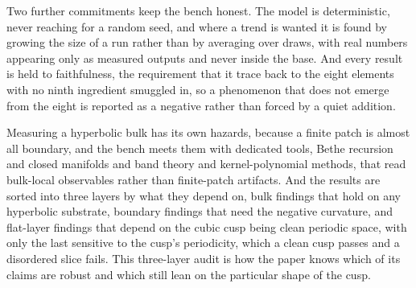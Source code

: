 Two further commitments keep the bench honest. The model is deterministic, never reaching for a random seed, and where a trend is wanted it is found by growing the size of a run rather than by averaging over draws, with real numbers appearing only as measured outputs and never inside the base. And every result is held to faithfulness, the requirement that it trace back to the eight elements with no ninth ingredient smuggled in, so a phenomenon that does not emerge from the eight is reported as a negative rather than forced by a quiet addition.

Measuring a hyperbolic bulk has its own hazards, because a finite patch is almost all boundary, and the bench meets them with dedicated tools, Bethe recursion and closed manifolds and band theory and kernel-polynomial methods, that read bulk-local observables rather than finite-patch artifacts. And the results are sorted into three layers by what they depend on, bulk findings that hold on any hyperbolic substrate, boundary findings that need the negative curvature, and flat-layer findings that depend on the cubic cusp being clean periodic space, with only the last sensitive to the cusp's periodicity, which a clean cusp passes and a disordered slice fails. This three-layer audit is how the paper knows which of its claims are robust and which still lean on the particular shape of the cusp.
